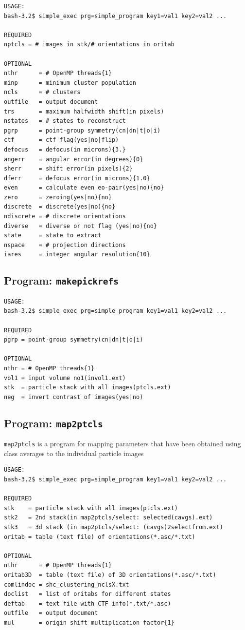 \documentclass[a4paper,11pt]{article}
\newcommand{\prgname}[1]{\textcolor{NavyBlue}{\texttt{#1}}}
\begin{document}
\begin{verbatim}
USAGE:
bash-3.2$ simple_exec prg=simple_program key1=val1 key2=val2 ...

REQUIRED
nptcls = # images in stk/# orientations in oritab

OPTIONAL
nthr      = # OpenMP threads{1}
minp      = minimum cluster population
ncls      = # clusters
outfile   = output document
trs       = maximum halfwidth shift(in pixels)
nstates   = # states to reconstruct
pgrp      = point-group symmetry(cn|dn|t|o|i)
ctf       = ctf flag(yes|no|flip)
defocus   = defocus(in microns){3.}
angerr    = angular error(in degrees){0}
sherr     = shift error(in pixels){2}
dferr     = defocus error(in microns){1.0}
even      = calculate even eo-pair(yes|no){no}
zero      = zeroing(yes|no){no}
discrete  = discrete(yes|no){no}
ndiscrete = # discrete orientations
diverse   = diverse or not flag (yes|no){no}
state     = state to extract
nspace    = # projection directions
iares     = integer angular resolution{10}
\end{verbatim}

\subsection{Program: \prgname{makepickrefs}}
\label{makepickrefs}
\begin{verbatim}
USAGE:
bash-3.2$ simple_exec prg=simple_program key1=val1 key2=val2 ...

REQUIRED
pgrp = point-group symmetry(cn|dn|t|o|i)

OPTIONAL
nthr = # OpenMP threads{1}
vol1 = input volume no1(invol1.ext)
stk  = particle stack with all images(ptcls.ext)
neg  = invert contrast of images(yes|no)
\end{verbatim}

\subsection{Program: \prgname{map2ptcls}}
\label{map2ptcls}
\prgname{map2ptcls} is a program for mapping parameters that have been obtained using class averages to the individual particle images

\begin{verbatim}
USAGE:
bash-3.2$ simple_exec prg=simple_program key1=val1 key2=val2 ...

REQUIRED
stk    = particle stack with all images(ptcls.ext)
stk2   = 2nd stack(in map2ptcls/select: selected(cavgs).ext)
stk3   = 3d stack (in map2ptcls/select: (cavgs)2selectfrom.ext)
oritab = table (text file) of orientations(*.asc/*.txt)

OPTIONAL
nthr      = # OpenMP threads{1}
oritab3D  = table (text file) of 3D orientations(*.asc/*.txt)
comlindoc = shc_clustering_nclsX.txt
doclist   = list of oritabs for different states
deftab    = text file with CTF info(*.txt/*.asc)
outfile   = output document
mul       = origin shift multiplication factor{1}
\end{verbatim}
\end{document}
